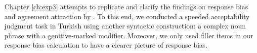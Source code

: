 Chapter \ref{ch:exp3} attempts to replicate and clarify the findings on response bias and agreement attraction by . To this end, we conducted a speeded acceptability judgment task in Turkish using another syntactic construction: a complex noun phrase with a genitive-marked modifier. Moreover, we only used filler items in our response bias calculation to have a clearer picture of response bias.


